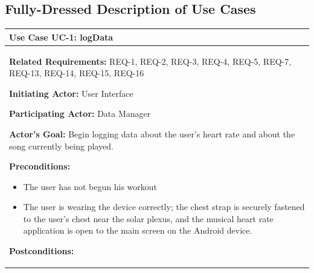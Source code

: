 \documentclass[letterpaper,english, 12pt]{scrreprt}
\begin{document}
\subsection{Fully-Dressed Description of Use Cases}

\begin{center}
        \begin{longtable}{|C{15cm}|}
                \hline
                        \textbf{Use Case UC-1: logData}\\
                \hline
                        \begin{flushleft}
                                \textbf{Related Requirements: } REQ-1, REQ-2, REQ-3, REQ-4, REQ-5, REQ-7, REQ-13, REQ-14, REQ-15, REQ-16
                        \end{flushleft}
                        \begin{flushleft}
                                \textbf{Initiating Actor: } User Interface
                        \end{flushleft}
                        \begin{flushleft}
                                \textbf{Participating Actor: } Data Manager
                        \end{flushleft}
                        \begin{flushleft}
                                \textbf{Actor's Goal: } Begin logging data about the user's heart rate and about the song currently being played.
                        \end{flushleft}
                        \begin{flushleft}
                                \textbf{Preconditions: }
                        \end{flushleft}
                                \begin{itemize}
                                        \item The user has not begun his workout
                                        \item The user is wearing the device correctly; the chest strap is securely fastened to the user's chest near the solar plexus, and the musical heart rate application is open to the main screen on the Android device.
                                \end{itemize}
                        \begin{flushleft}
                                \textbf{Postconditions: }
                        \end{flushleft}

\end{longtable}
\end{center}
\end{document}
